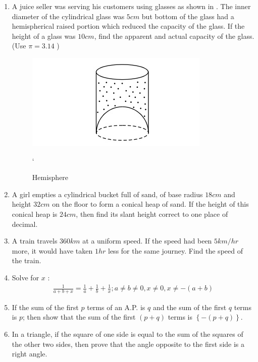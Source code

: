 \documentclass[2pt,-letter paper]{article}
\providecommand{\cbrak}[1]{\ensuremath{\left\{#1\right\}}}
\providecommand{\brak}[1]{\ensuremath{\left(#1\right)}}
\begin{document}
\begin{enumerate}
\item A juice seller was serving his customers using glasses as shown in  . The inner diameter of the cylindrical glass was $5 cm$ but bottom of the glass had a hemispherical raised portion which reduced the capacity of the glass. If the height of a glass was $10 cm$, find the apparent and actual capacity of the glass. (Use $\pi = 3.14$ )
\begin{figure}[H]
    \centering
    \includegraphics[width=\columnwidth]{figures/Figure_3.png}
    \caption{Hemisphere}
    \label{fig:Fig_3}`
\end{figure}

\item A girl empties a cylindrical bucket full of sand, of base radius $18 cm$ and height $32 cm$ on the floor to form a conical heap of sand. If the height of this conical heap is $24 cm$, then find its slant height correct to one place of decimal.

\item A train travels $360 km$ at a uniform speed. If the speed had been $5 km/hr$ more, it would have taken $1 hr$ less for the same journey. Find the speed of the train.

\item Solve for $x$ :
\begin{align*}
    {\frac {1}{a+b+x}} = {\frac{1}{a}} + {\frac{1}{b}} + {\frac{1}{x}};  {a\neq b \neq 0},{x \neq 0},{x \neq -(a+b)}
\end{align*}

\item If the sum of the first $p$ terms of an A.P. is $q$ and the sum of the first $q$ terms is $p$; then show that the sum of the first $\brak{p + q}$ terms is $\cbrak {-\brak {p + q}}$.

\item In a triangle, if the square of one side is equal to the sum of the squares of the other two sides, then prove that the angle opposite to the first side is a right angle.


\end{enumerate}
\end{document}
